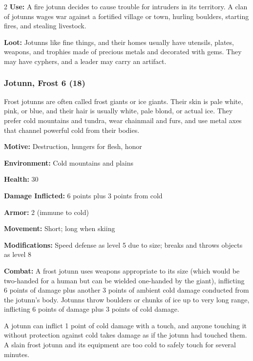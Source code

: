 \begin{multicols}{2}
\textbf{Use:} A fire jotunn decides to cause trouble for intruders in its territory. A clan of jotunns wages war against a fortified village or town, hurling boulders, starting fires, and stealing livestock. 

\textbf{Loot:} Jotunns like fine things, and their homes usually have utensils, plates, weapons, and trophies made of precious metals and decorated with gems. They may have cyphers, and a leader may carry an artifact.

\subsubsection{Jotunn, Frost 6 (18)}

Frost jotunns are often called frost giants or ice giants. Their skin is pale white, pink, or blue, and their hair is usually white, pale blond, or actual ice. They prefer cold mountains and tundra, wear chainmail and furs, and use metal axes that channel powerful cold from their bodies. 

\textbf{Motive:} Destruction, hungers for flesh, honor 

\textbf{Environment:} Cold mountains and plains 

\textbf{Health:} 30 

\textbf{Damage Inflicted:} 6 points plus 3 points from cold 

\textbf{Armor:} 2 (immune to cold) 

\textbf{Movement:} Short; long when skiing 

\textbf{Modifications:} Speed defense as level 5 due to size; breaks and throws objects as level 8 

\textbf{Combat:} A frost jotunn uses weapons appropriate to its size (which would be two-handed for a human but can be wielded one-handed by the giant), inflicting 6 points of damage plus another 3 points of ambient cold damage conducted from the jotunn’s body. Jotunns throw boulders or chunks of ice up to very long range, inflicting 6 points of damage plus 3 points of cold damage. 

A jotunn can inflict 1 point of cold damage with a touch, and anyone touching it without protection against cold takes damage as if the jotunn had touched them. A slain frost jotunn and its equipment are too cold to safely touch for several minutes. 


\end{multicols}
